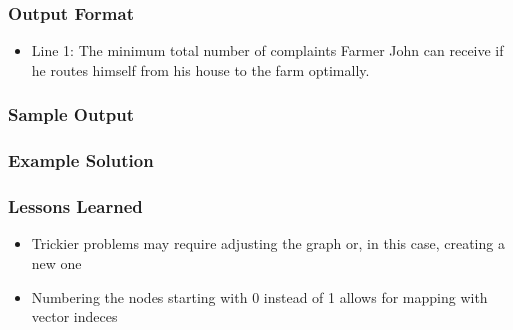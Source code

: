 \subsubsection{Output Format}
\begin{itemize}
	\item Line 1: The minimum total number of complaints Farmer John can receive if he
        			routes himself from his house to the farm optimally.
\end{itemize}

\subsubsection{Sample Output}

\subsubsection{Example Solution\cite{gpsduelsolution}}

\subsubsection{Lessons Learned}
\begin{itemize}
	\item Trickier problems may require adjusting the graph or, in this case, creating a new one
	\item Numbering the nodes starting with 0 instead of 1 allows for mapping with vector indeces
\end{itemize}